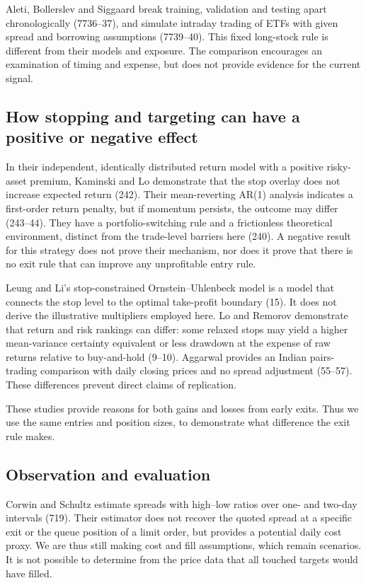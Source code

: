 \documentclass[11pt,a4paper]{article}
\begin{document}
Aleti, Bollerslev and Siggaard break training, validation and testing apart chronologically (7736--37), and simulate intraday trading of ETFs with given spread and borrowing assumptions (7739--40). This fixed long-stock rule is different from their models and exposure. The comparison encourages an examination of timing and expense, but does not provide evidence for the current signal.

\subsection*{How stopping and targeting can have a positive or negative effect}

In their independent, identically distributed return model with a positive risky-asset premium, Kaminski and Lo demonstrate that the stop overlay does not increase expected return (242). Their mean-reverting AR(1) analysis indicates a first-order return penalty, but if momentum persists, the outcome may differ (243--44). They have a portfolio-switching rule and a frictionless theoretical environment, distinct from the trade-level barriers here (240). A negative result for this strategy does not prove their mechanism, nor does it prove that there is no exit rule that can improve any unprofitable entry rule.

Leung and Li's stop-constrained Ornstein--Uhlenbeck model is a model that connects the stop level to the optimal take-profit boundary (15). It does not derive the illustrative multipliers employed here. Lo and Remorov demonstrate that return and risk rankings can differ: some relaxed stops may yield a higher mean-variance certainty equivalent or less drawdown at the expense of raw returns relative to buy-and-hold (9--10). Aggarwal provides an Indian pairs-trading comparison with daily closing prices and no spread adjustment (55--57). These differences prevent direct claims of replication.

These studies provide reasons for both gains and losses from early exits. Thus we use the same entries and position sizes, to demonstrate what difference the exit rule makes.

\subsection*{Observation and evaluation}

Corwin and Schultz estimate spreads with high--low ratios over one- and two-day intervals (719). Their estimator does not recover the quoted spread at a specific exit or the queue position of a limit order, but provides a potential daily cost proxy. We are thus still making cost and fill assumptions, which remain scenarios. It is not possible to determine from the price data that all touched targets would have filled.
\end{document}
